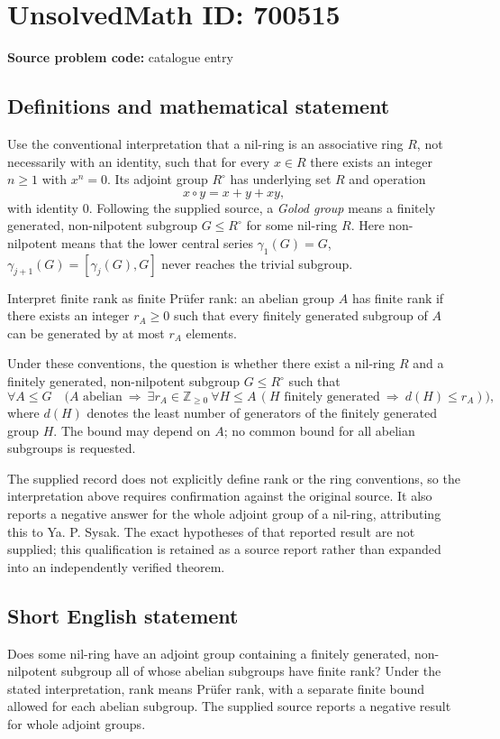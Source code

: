 \documentclass[11pt]{article}
\newcommand{\Z}{\mathbb{Z}}
\begin{document}
\section*{UnsolvedMath ID: 700515}
\textbf{Source problem code:} catalogue entry
\subsection{Definitions and mathematical statement}
Use the conventional interpretation that a nil-ring is an associative ring \(R\), not necessarily with an identity, such that for every \(x\in R\) there exists an integer \(n\geq 1\) with \(x^n=0\). Its adjoint group \(R^\circ\) has underlying set \(R\) and operation
\[
x\circ y=x+y+xy,
\]
with identity \(0\). Following the supplied source, a \emph{Golod group} means a finitely generated, non-nilpotent subgroup \(G\leq R^\circ\) for some nil-ring \(R\). Here non-nilpotent means that the lower central series \(\gamma_1(G)=G\), \(\gamma_{j+1}(G)=[\gamma_j(G),G]\) never reaches the trivial subgroup.

Interpret finite rank as finite Pr\"ufer rank: an abelian group \(A\) has finite rank if there exists an integer \(r_A\geq 0\) such that every finitely generated subgroup of \(A\) can be generated by at most \(r_A\) elements.

Under these conventions, the question is whether there exist a nil-ring \(R\) and a finitely generated, non-nilpotent subgroup \(G\leq R^\circ\) such that
\[
\forall A\leq G\quad
\bigl(A\text{ abelian}\ \Longrightarrow\
\exists r_A\in\Z_{\geq 0}\ \forall H\leq A\,
(H\text{ finitely generated}\ \Longrightarrow\ d(H)\leq r_A)\bigr),
\]
where \(d(H)\) denotes the least number of generators of the finitely generated group \(H\). The bound may depend on \(A\); no common bound for all abelian subgroups is requested.

The supplied record does not explicitly define rank or the ring conventions, so the interpretation above requires confirmation against the original source. It also reports a negative answer for the whole adjoint group of a nil-ring, attributing this to Ya. P. Sysak. The exact hypotheses of that reported result are not supplied; this qualification is retained as a source report rather than expanded into an independently verified theorem.
\subsection{Short English statement}
Does some nil-ring have an adjoint group containing a finitely generated, non-nilpotent subgroup all of whose abelian subgroups have finite rank? Under the stated interpretation, rank means Pr\"ufer rank, with a separate finite bound allowed for each abelian subgroup. The supplied source reports a negative result for whole adjoint groups.
\end{document}
